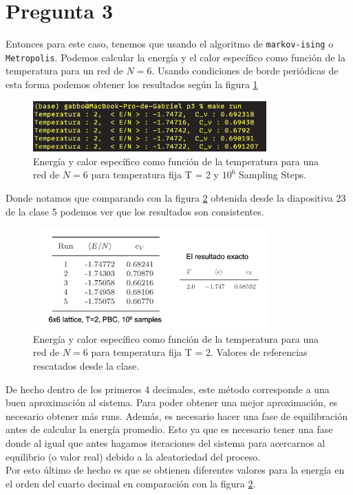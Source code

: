 \documentclass[11pt,a4paper]{article}
\begin{document}
\newpage
\section*{Pregunta 3}
Entonces para este caso, tenemos que usando el algoritmo de \texttt{markov-ising} o \texttt{Metropolis}. Podemos calcular la energía y el calor específico como función de la temperatura para un red de $N = 6$.
Usando condiciones de borde periódicas de esta forma podemos obtener los resultados según la figura \ref{fig:p3_1}
\begin{figure}[H]
    \centering
    \includegraphics[width=0.8\textwidth]{p3/p3_1.png}
    \caption{Energía y calor específico como función de la temperatura para una red de $N = 6$ para temperatura fija T = 2 y $10^6$ Sampling Steps.}
    \label{fig:p3_1}
\end{figure}
Donde notamos que comparando con la figura \ref{fig:p3_2} obtenida desde la diapositiva 23 de la clase 5 podemos ver que los resultados son consistentes.
\begin{figure}[H]
    \centering
    \includegraphics[width=0.8\textwidth]{p3/p3_2.png}
    \caption{Energía y calor específico como función de la temperatura para una red de $N = 6$ para temperatura fija T = 2. Valores de referencias rescatados desde la clase.}
    \label{fig:p3_2}
\end{figure}
De hecho dentro de los primeros 4 decimales, este método corresponde a una buen aproximación al sistema. Para poder obtener una mejor aproximación, es necesario obtener más runs.
Además, es necesario hacer una fase de equilibración antes de calcular la energía promedio. Esto ya que es necesario tener una fase donde al igual que antes hagamos iteraciones del sistema para 
acercarnos al equilibrio (o valor real) debido a la aleatoriedad del proceso. \\
Por esto último de hecho es que se obtienen diferentes valores para la energía en el orden del cuarto decimal en comparación con la figura \ref{fig:p3_2}. 
\end{document}
